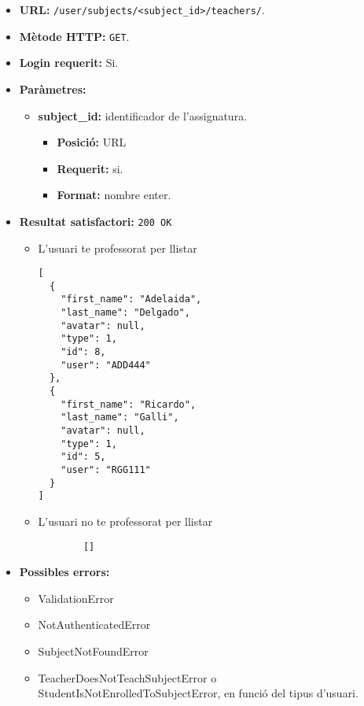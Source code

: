 \begin{itemize}
\item \textbf{\ac{URL}: } \texttt{/user/subjects/<subject\_id>/teachers/}.
\item \textbf{Mètode \ac{HTTP}: } \texttt{GET}.
\item \textbf{Login requerit:} Si.
\item \textbf{Paràmetres:}
	\begin{itemize}
		\item \textbf{subject\_id:} identificador de l'assignatura.
		\begin{itemize}
			\item \textbf{Posició:} \ac{URL}
			\item \textbf{Requerit:} si.
			\item \textbf{Format:} nombre enter.
		\end{itemize}
	\end{itemize}
	
\item \textbf{Resultat satisfactori:} \texttt{200 OK}
	\begin{itemize}
		\item L'usuari te professorat per llistar
		\begin{verbatim}
[
  {
    "first_name": "Adelaida",
    "last_name": "Delgado",
    "avatar": null,
    "type": 1,
    "id": 8,
    "user": "ADD444"
  },
  {
    "first_name": "Ricardo",
    "last_name": "Galli",
    "avatar": null,
    "type": 1,
    "id": 5,
    "user": "RGG111"
  }
]
		\end{verbatim}
		\item L'usuari no te professorat per llistar
		\begin{verbatim}
		[]
		\end{verbatim}
	\end{itemize}
\item \textbf{Possibles errors:}
	\begin{itemize}
		\item ValidationError
		\item NotAuthenticatedError
		\item SubjectNotFoundError
		\item TeacherDoesNotTeachSubjectError o StudentIsNotEnrolledToSubjectError, en funció del tipus d'usuari.
	\end{itemize}
\end{itemize}

